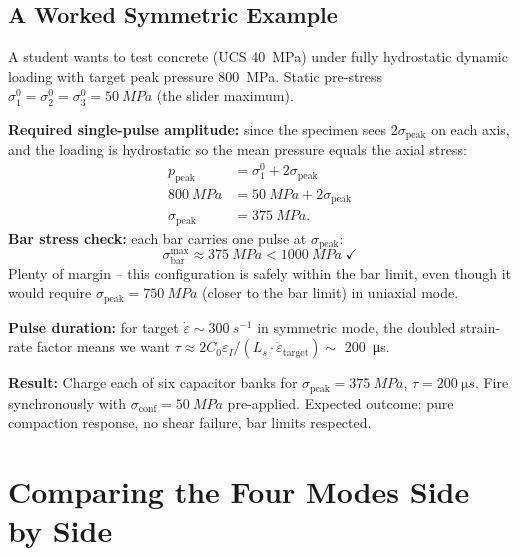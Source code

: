\documentclass[11pt,a4paper]{article}
\providecommand{\SI}[2]{\qty{#1}{#2}}
\newcommand{\sig}{\sigma}
\newcommand{\eps}{\varepsilon}
\newcommand{\epsdot}{\dot\eps}
\newcommand{\Cz}{C_0}
\newcommand{\Ls}{L_s}
\newcommand{\sigpeak}{\sig_{\text{peak}}}
\begin{document}
\subsection{A Worked Symmetric Example}

A student wants to test concrete (UCS \SI{40}{MPa}) under fully hydrostatic
dynamic loading with target peak pressure \SI{800}{MPa}. Static pre-stress
$\sig_1^0 = \sig_2^0 = \sig_3^0 = \SI{50}{MPa}$ (the slider maximum).

\textbf{Required single-pulse amplitude:} since the specimen sees
$2 \sigpeak$ on each axis, and the loading is hydrostatic so the mean pressure
equals the axial stress:
\begin{align*}
  p_{\text{peak}} &= \sig_1^0 + 2\sigpeak \\
  \SI{800}{MPa} &= \SI{50}{MPa} + 2\sigpeak \\
  \sigpeak &= \SI{375}{MPa}.
\end{align*}
\textbf{Bar stress check:} each bar carries one pulse at $\sigpeak$:
\[
  \sig_{\text{bar}}^{\max} \approx \SI{375}{MPa} < \SI{1000}{MPa} \;\checkmark
\]
Plenty of margin -- this configuration is safely within the bar limit, even
though it would require $\sigpeak = \SI{750}{MPa}$ (closer to the bar limit) in
uniaxial mode.

\textbf{Pulse duration:} for target $\epsdot \sim \SI{300}{s^{-1}}$ in
symmetric mode, the doubled strain-rate factor means we want
$\tau \approx 2\Cz \eps_I / (\Ls \cdot \epsdot_{\text{target}}) \sim$
\SI{200}{\micro s}.

\textbf{Result:} Charge each of six capacitor banks for $\sigpeak = \SI{375}{MPa}$,
$\tau = \SI{200}{\micro s}$. Fire synchronously with $\sig_{\text{conf}} =
\SI{50}{MPa}$ pre-applied. Expected outcome: pure compaction response, no shear
failure, bar limits respected.

\newpage
\section{Comparing the Four Modes Side by Side}
\end{document}

